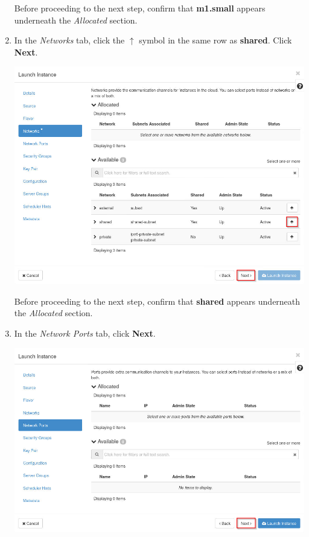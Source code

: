 \documentclass[letterpaper, 12pt]{article}
\begin{document}
\begin{enumerate}
    \begin{stopbox}{}
        Before proceeding to the next step, confirm that \textbf{m1.small} appears underneath the \textit{Allocated}
        section.
    \end{stopbox}

    \item In the \textit{Networks} tab, click the $\uparrow$ symbol in the same row as \textbf{shared}. Click
    \textbf{Next}.

    \begin{center}
        \includegraphics[width=\linewidth]{images/part1/step22.png}
    \end{center}

    \begin{stopbox}{}
        Before proceeding to the next step, confirm that \textbf{shared} appears underneath the \textit{Allocated}
        section.
    \end{stopbox}

    \item In the \textit{Network Ports} tab, click \textbf{Next}.
    
    \begin{center}
        \includegraphics[width=\linewidth]{images/part1/step23.png}
    \end{center}


\end{enumerate}
\end{document}
